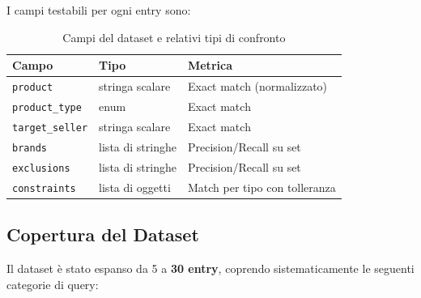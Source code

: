 I campi testabili per ogni entry sono:

\begin{table}[htbp]
\centering
\caption{Campi del dataset e relativi tipi di confronto}
\label{tab:dataset-fields}
\begin{tabular}{lll}
\toprule
\textbf{Campo} & \textbf{Tipo} & \textbf{Metrica} \\
\midrule
\texttt{product}       & stringa scalare   & Exact match (normalizzato) \\
\texttt{product\_type} & enum              & Exact match \\
\texttt{target\_seller}& stringa scalare   & Exact match \\
\texttt{brands}        & lista di stringhe & Precision/Recall su set \\
\texttt{exclusions}    & lista di stringhe & Precision/Recall su set \\
\texttt{constraints}   & lista di oggetti  & Match per tipo con tolleranza \\
\bottomrule
\end{tabular}
\end{table}

\subsection{Copertura del Dataset}
\label{subsec:dataset-coverage}

Il dataset è stato espanso da 5 a \textbf{30 entry}, coprendo
sistematicamente le seguenti categorie di query:

